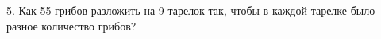 5. Как 55 грибов разложить на 9 тарелок так, чтобы в каждой тарелке было разное количество грибов?\\
